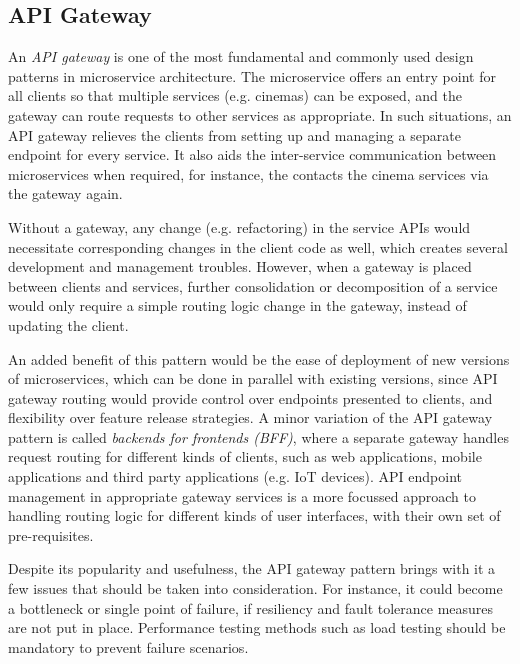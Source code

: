 \subsection{API Gateway}

An \textit{API gateway} is one of the most fundamental and commonly used design patterns in microservice architecture. The  microservice offers an entry point for all clients so that multiple services (e.g. cinemas) can be exposed, and the gateway can route requests to other services as appropriate. In such situations, an API gateway relieves the clients from setting up and managing a separate endpoint for every service. It also aids the inter-service communication between microservices when required, for instance, the  contacts the cinema services via the gateway again.

Without a gateway, any change (e.g. refactoring) in the service APIs would necessitate corresponding changes in the client code as well, which creates several development and management troubles. However, when a gateway is placed between clients and services, further consolidation or decomposition of a service would only require a simple routing logic change in the gateway, instead of updating the client.

An added benefit of this pattern would be the ease of deployment of new versions of microservices, which can be done in parallel with existing versions, since API gateway routing would provide control over endpoints presented to clients, and flexibility over feature release strategies. A minor variation of the API gateway pattern is called \textit{backends for frontends (BFF)}, where a separate gateway handles request routing for different kinds of clients, such as web applications, mobile applications and third party applications (e.g. IoT devices). API endpoint management in appropriate gateway services is a more focussed approach to handling routing logic for different kinds of user interfaces, with their own set of pre-requisites.

Despite its popularity and usefulness, the API gateway pattern brings with it a few issues that should be taken into consideration. For instance, it could become a bottleneck or single point of failure, if resiliency and fault tolerance measures are not put in place. Performance testing methods such as load testing should be mandatory to prevent failure scenarios.

